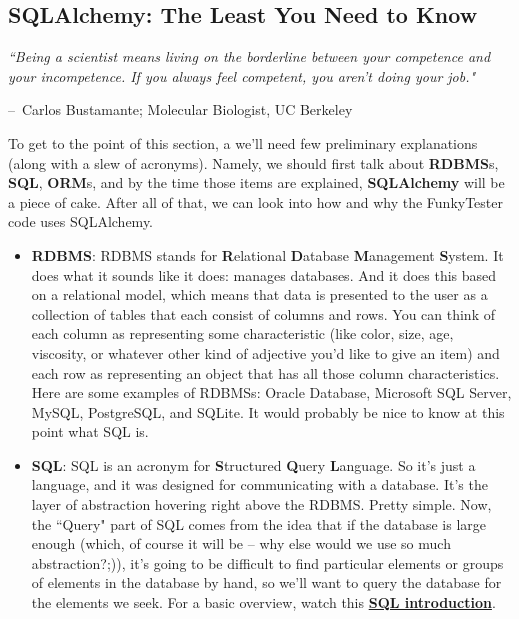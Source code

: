 \documentclass{report}
\makeatletter
\newenvironment{chapquote}[2][2em]
  {\setlength{\@tempdima}{#1}%
   \def\chapquote@author{#2}%
   \parshape 1 \@tempdima \dimexpr\textwidth-2\@tempdima\relax%
   \itshape}
  {\par\normalfont\hfill--\ \chapquote@author\hspace*{\@tempdima}\par\bigskip}
\makeatother
\begin{document}
\begin{appendices}
\chapter{SQLAlchemy: The Least You Need to Know}	\label{app:SQL}
\begin{chapquote}{Carlos Bustamante; Molecular Biologist, UC Berkeley \textit{}}
``Being a scientist means living on the borderline between your competence and your incompetence. If you always feel competent, you aren't doing your job."
\end{chapquote}

To get to the point of this section, a we'll need few preliminary explanations (along with a slew of acronyms). Namely, we should first talk about \textbf{RDBMS}s, \textbf{SQL}, \textbf{ORM}s, and by the time those items are explained, \textbf{SQLAlchemy} will be a piece of cake. After all of that, we can look into how and why the FunkyTester code uses SQLAlchemy.
	\begin{itemize}
	\item\textbf{RDBMS}: RDBMS stands for \textbf{R}elational \textbf{D}atabase \textbf{M}anagement \textbf{S}ystem. It does what it sounds like it does: manages databases. And it does this based on a relational model, which means that data is presented to the user as a collection of tables that each consist of columns and rows. You can think of each column as representing some characteristic (like color, size, age, viscosity, or whatever other kind of adjective you'd like to give an item) and each row as representing an object that has all those column characteristics. Here are some examples of RDBMSs: Oracle Database, Microsoft SQL Server, MySQL, PostgreSQL, and SQLite. It would probably be nice to know at this point what SQL is.
	\item\textbf{SQL}: SQL is an acronym for \textbf{S}tructured \textbf{Q}uery \textbf{L}anguage. So it's just a language, and it was designed for communicating with a database. It's the layer of abstraction hovering right above the RDBMS. Pretty simple.
	Now, the ``Query" part of SQL comes from the idea that if the database is large enough (which, of course it will be -- why else would we use so much abstraction?;)), it's going to be difficult to find particular elements or groups of elements in the database by hand, so we'll want to query the database for the elements we seek. For a basic overview, watch this \href{http://www.youtube.com/watch?v=EUB113i_mzA}{\textbf{SQL introduction}}.

\end{itemize}
\end{appendices}
\end{document}
